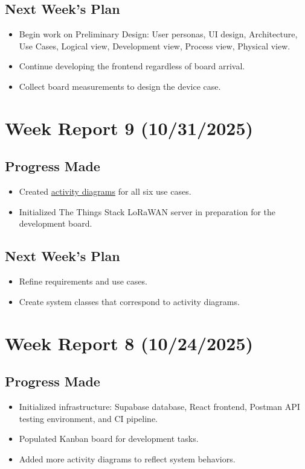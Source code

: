 \subsection{Next Week's Plan}
\begin{itemize}
    \item Begin work on Preliminary Design: User personas, UI design, Architecture, Use Cases, Logical view, Development view, Process view, Physical view.
    \item Continue developing the frontend regardless of board arrival.
    \item Collect board measurements to design the device case.
\end{itemize}


\section{Week Report 9 (10/31/2025)}
\label{sec:report9}

\subsection{Progress Made}
\begin{itemize}
    \item Created \hyperref[section::activityDiagrams]{activity diagrams} for all six use cases.
    \item Initialized The Things Stack LoRaWAN server in preparation for the development board.
\end{itemize}

\subsection{Next Week's Plan}
\begin{itemize}
    \item Refine requirements and use cases.
    \item Create system classes that correspond to activity diagrams.
\end{itemize}


\section{Week Report 8 (10/24/2025)}
\label{sec:report8}

\subsection{Progress Made}
\begin{itemize}
    \item Initialized infrastructure: Supabase database, React frontend, Postman API testing environment, and CI pipeline.
    \item Populated Kanban board for development tasks.
    \item Added more activity diagrams to reflect system behaviors.
\end{itemize}


